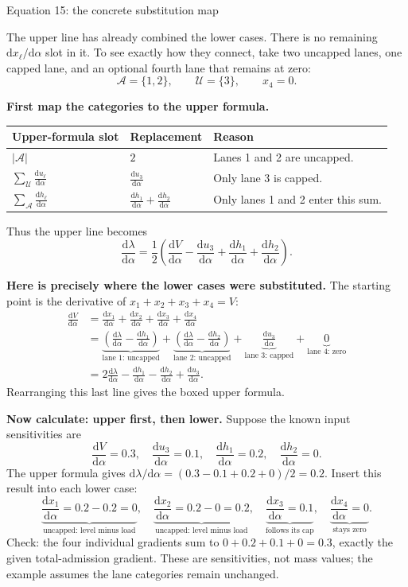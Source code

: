\documentclass[11pt,a4paper]{article}
\newcommand{\der}[1]{\frac{\mathrm d #1}{\mathrm d\alpha}}
\begin{document}
\begin{center}
{\Large Equation 15: the concrete substitution map}
\end{center}

The upper line has already combined the lower cases. There is no remaining
$\mathrm dx_\ell/\mathrm d\alpha$ slot in it. To see exactly how they connect,
take two uncapped lanes, one capped lane, and an optional fourth lane
that remains at zero:
\[
 \mathcal A=\{1,2\},\qquad \mathcal U=\{3\},\qquad x_4=0.
\]

\textbf{First map the categories to the upper formula.}
\begin{center}
\renewcommand{\arraystretch}{1.5}
\begin{tabular}{@{}lll@{}}
\toprule
Upper-formula slot & Replacement & Reason\\
\midrule
$|\mathcal A|$ & $2$ & Lanes 1 and 2 are uncapped.\\
$\displaystyle\sum_{\mathcal U}\der{u_\ell}$
 & $\displaystyle\der{u_3}$ & Only lane 3 is capped.\\
$\displaystyle\sum_{\mathcal A}\der{h_\ell}$
 & $\displaystyle\der{h_1}+\der{h_2}$ & Only lanes 1 and 2 enter this sum.\\
\bottomrule
\end{tabular}
\end{center}
Thus the upper line becomes
\[
 \boxed{\der{\lambda}
 =\frac12\left(\der{V}-\der{u_3}+\der{h_1}+\der{h_2}\right).}
\]

\textbf{Here is precisely where the lower cases were substituted.}
The starting point is the derivative of $x_1+x_2+x_3+x_4=V$:
\begin{align*}
 \der{V}
 &=\der{x_1}+\der{x_2}+\der{x_3}+\der{x_4}\\
 &=\underbrace{\left(\der{\lambda}-\der{h_1}\right)}_{\text{lane 1: uncapped}}
  +\underbrace{\left(\der{\lambda}-\der{h_2}\right)}_{\text{lane 2: uncapped}}
  +\underbrace{\der{u_3}}_{\text{lane 3: capped}}
  +\underbrace{0}_{\text{lane 4: zero}}\\
 &=2\der{\lambda}-\der{h_1}-\der{h_2}+\der{u_3}.
\end{align*}
Rearranging this last line gives the boxed upper formula.

\textbf{Now calculate: upper first, then lower.}
Suppose the known input sensitivities are
\[
 \der{V}=0.3,\quad \der{u_3}=0.1,\quad
 \der{h_1}=0.2,\quad \der{h_2}=0.
\]
The upper formula gives
$\mathrm d\lambda/\mathrm d\alpha=(0.3-0.1+0.2+0)/2=0.2$.
Insert this result into each lower case:
\[
 \underbrace{\der{x_1}=0.2-0.2=0}_{\text{uncapped: level minus load}},\quad
 \underbrace{\der{x_2}=0.2-0=0.2}_{\text{uncapped: level minus load}},\quad
 \underbrace{\der{x_3}=0.1}_{\text{follows its cap}},\quad
 \underbrace{\der{x_4}=0}_{\text{stays zero}}.
\]
Check: the four individual gradients sum to $0+0.2+0.1+0=0.3$, exactly
the given total-admission gradient. These are sensitivities, not mass
values; the example assumes the lane categories remain unchanged.
\end{document}
